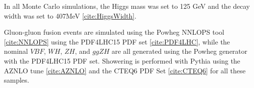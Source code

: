 In all Monte Carlo simulations, the Higgs mass was set to 125 GeV and the decay width was set to 407MeV \ref{cite:HiggsWidth}.

\begin{table}[h!]
  \centering
  \caption{Summary of nominal signal samples}
  \label{tab:signal_samples_pyt}
\end{table}

Gluon-gluon fusion events are simulated using the Powheg NNLOPS tool \ref{cite:NNLOPS} using the PDF4LHC15 PDF set \ref{cite:PDF4LHC}, while the nominal $VBF$, $WH$, $ZH$, and $ggZH$ are all generated using the Powheg generator with the PDF4LHC15 PDF set. Showering is performed with Pythia using the AZNLO tune \ref{cite:AZNLO} and the CTEQ6 PDF Set \ref{cite:CTEQ6} for all these samples.





